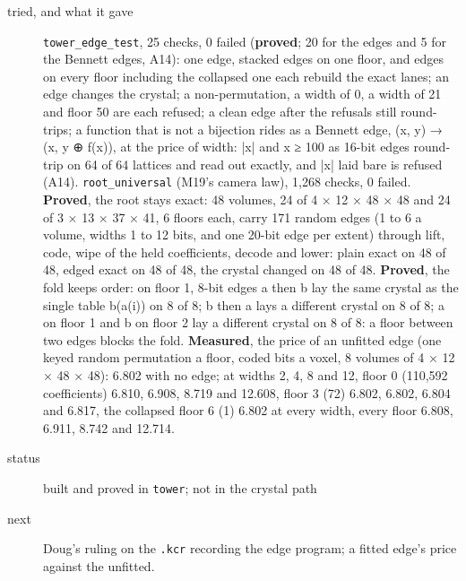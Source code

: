 \begin{description}
\item[{tried, and what it gave}] \texttt{tower\_\allowbreak{}edge\_\allowbreak{}test}, 25 checks, 0 failed (\textbf{proved}; 20 for the edges and 5 for the Bennett edges, A14): one edge, stacked edges on one floor, and edges on every floor including the collapsed one each rebuild the exact lanes; an edge changes the crystal; a non-permutation, a width of 0, a width of 21 and floor 50 are each refused; a clean edge after the refusals still round-trips; a function that is not a bijection rides as a Bennett edge, (x, y) → (x, y ⊕ f(x)), at the price of width: |x| and x ≥ 100 as 16-bit edges round-trip on 64 of 64 lattices and read out exactly, and |x| laid bare is refused (A14). \texttt{root\_\allowbreak{}universal} (M19's camera law), 1,268 checks, 0 failed. \textbf{Proved}, the root stays exact: 48 volumes, 24 of 4 × 12 × 48 × 48 and 24 of 3 × 13 × 37 × 41, 6 floors each, carry 171 random edges (1 to 6 a volume, widths 1 to 12 bits, and one 20-bit edge per extent) through lift, code, wipe of the held coefficients, decode and lower: plain exact on 48 of 48, edged exact on 48 of 48, the crystal changed on 48 of 48. \textbf{Proved}, the fold keeps order: on floor 1, 8-bit edges a then b lay the same crystal as the single table b(a(i)) on 8 of 8; b then a lays a different crystal on 8 of 8; a on floor 1 and b on floor 2 lay a different crystal on 8 of 8: a floor between two edges blocks the fold. \textbf{Measured}, the price of an unfitted edge (one keyed random permutation a floor, coded bits a voxel, 8 volumes of 4 × 12 × 48 × 48): 6.802 with no edge; at widths 2, 4, 8 and 12, floor 0 (110,592 coefficients) 6.810, 6.908, 8.719 and 12.608, floor 3 (72) 6.802, 6.802, 6.804 and 6.817, the collapsed floor 6 (1) 6.802 at every width, every floor 6.808, 6.911, 8.742 and 12.714.
\item[{status}] built and proved in \texttt{tower}; not in the crystal path
\item[{next}] Doug's ruling on the \texttt{.\allowbreak{}kcr} recording the edge program; a fitted edge's price against the unfitted.
\end{description}

